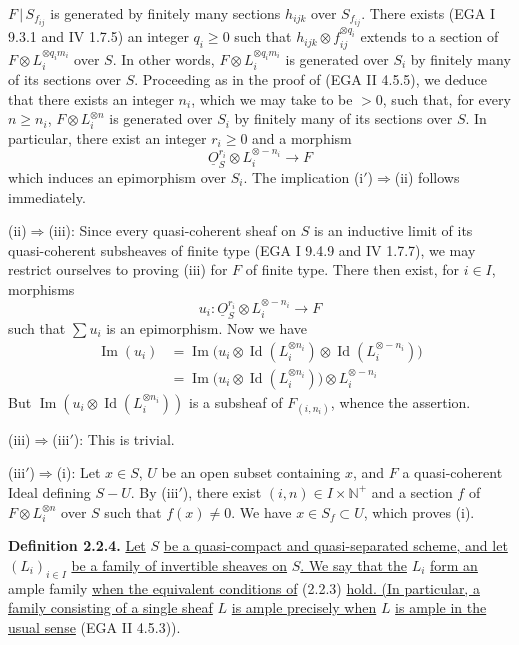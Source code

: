 %
$F\,|\,S_{f_{ij}}$ is
generated by finitely many sections $h_{ijk}$ over $S_{f_{ij}}$. There exists (EGA I 9.3.1 and IV 1.7.5) an integer $q_i\ge0$ such that $h_{ijk}\otimes f_{ij}^{\otimes q_i}$ extends to a section of $F\otimes L_i^{\otimes q_im_i}$ over $S$. In other words, $F\otimes L_i^{\otimes q_im_i}$ is generated over $S_i$ by finitely many of its sections over $S$. Proceeding as in the proof of (EGA II 4.5.5), we deduce that there exists an integer $n_i$, which we may take to be $>0$, such that, for every $n\ge n_i$, $F\otimes L_i^{\otimes n}$ is generated over $S_i$ by finitely many of its sections over $S$. In particular, there exist an integer $r_i\ge0$ and a morphism
\[
\underline{O}_S^{r_i}\otimes L_i^{\otimes-n_i}\longrightarrow F
\]
which induces an epimorphism over $S_i$. The implication (i$'$)$\Rightarrow$(ii) follows immediately.

(ii)$\Rightarrow$(iii): Since every quasi-coherent sheaf on $S$ is an inductive limit of its quasi-coherent subsheaves of finite type (EGA I 9.4.9 and IV 1.7.7), we may restrict ourselves to proving (iii) for $F$ of finite type. There then exist, for $i\in I$, morphisms
\[
u_i:\underline{O}_S^{r_i}\otimes L_i^{\otimes-n_i}\longrightarrow F
\]
such that $\sum u_i$ is an epimorphism. Now we have
\[
\begin{aligned}
\operatorname{Im}(u_i)&=\operatorname{Im}\bigl(u_i\otimes\operatorname{Id}(L_i^{\otimes n_i})\otimes\operatorname{Id}(L_i^{\otimes-n_i})\bigr)\\
&=\operatorname{Im}\bigl(u_i\otimes\operatorname{Id}(L_i^{\otimes n_i})\bigr)\otimes L_i^{\otimes-n_i}
\end{aligned}
\]
But $\operatorname{Im}(u_i\otimes\operatorname{Id}(L_i^{\otimes n_i}))$ is a subsheaf of $F_{(i,n_i)}$, whence the assertion.

(iii)$\Rightarrow$(iii$'$): This is trivial.

(iii$'$)$\Rightarrow$(i): Let $x\in S$, $U$ be an open subset containing $x$, and $F$ a
%
quasi-coherent Ideal
defining $S-U$. By (iii$'$), there exist $(i,n)\in I\times\mathbb N^+$ and a section $f$ of $F\otimes L_i^{\otimes n}$ over $S$ such that $f(x)\ne0$. We have $x\in S_f\subset U$, which proves (i).

\textbf{Definition 2.2.4.} \uline{Let} $S$ \uline{be a quasi-compact and quasi-separated scheme, and let} $(L_i)_{i\in I}$ \uline{be a family of invertible sheaves on} $S$\uline{. We say that the} $L_i$ \uline{form an} ample family \uline{when the equivalent conditions of} (2.2.3) \uline{hold. (In particular, a family consisting of a single sheaf} $L$ \uline{is ample precisely when} $L$ \uline{is ample in the usual sense} (EGA II 4.5.3)).

